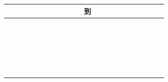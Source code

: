 \documentclass[10pt]{article}
\begin{document}
\begin{center}
\begin{tabular}{|c|c|c|c|c|c|c|c|c|c|c|c|c|c|c|c|c|c|c|c|c|c|}
\hline
 &  &  &  &  &  &  &  &  &  &  & 到 &  &  &  &  &  &  &  &  &  &  \\
\hline
 &  &  &  &  &  &  &  &  &  &  &  &  &  &  &  &  &  &  &  &  &  \\
\hline
 &  &  &  &  &  &  &  &  &  &  &  &  &  &  &  &  &  &  &  &  &  \\
\hline
 &  &  &  &  &  &  &  &  &  &  &  &  &  &  &  &  &  &  &  &  &  \\
\hline
 &  &  &  &  &  &  &  &  &  &  &  &  &  &  &  &  &  &  &  &  &  \\
\hline
 &  &  &  &  &  &  &  &  &  &  &  &  &  &  &  &  &  &  &  &  &  \\
\hline
 &  &  &  &  &  &  &  &  &  &  &  &  &  &  &  &  &  &  &  &  &  \\
\hline
 &  &  &  &  &  &  &  &  &  &  &  &  &  &  &  &  &  &  &  &  &  \\
\hline
 &  &  &  &  &  &  &  &  &  &  &  &  &  &  &  &  &  &  &  &  &  \\
\hline
 &  &  &  &  &  &  &  &  &  &  &  &  &  &  &  &  &  &  &  &  &  \\
\hline
 &  &  &  &  &  &  &  &  &  &  &  &  &  &  &  &  &  &  &  &  &  \\
\hline
 &  &  &  &  &  &  &  &  &  &  &  &  &  &  &  &  &  &  &  &  &  \\
\hline
 &  &  &  &  &  &  &  &  &  &  &  &  &  &  &  &  &  &  &  &  &  \\
\hline
 &  &  &  &  &  &  &  &  &  &  &  &  &  &  &  &  &  &  &  &  &  \\
\hline
 &  &  &  &  &  &  &  &  &  &  &  &  &  &  &  &  &  &  &  &  &  \\
\hline
 &  &  &  &  &  &  &  &  &  &  &  &  &  &  &  &  &  &  &  &  &  \\
\hline
 &  &  &  &  &  &  &  &  &  &  &  &  &  &  &  &  &  &  &  &  &  \\
\hline
 &  &  &  &  &  &  &  &  &  &  &  &  &  &  &  &  &  &  &  &  &  \\
\hline
 &  &  &  &  &  &  &  &  &  &  &  &  &  &  &  &  &  &  &  &  &  \\
\hline
 &  &  &  &  &  &  &  &  &  &  &  &  &  &  &  &  &  &  &  &  &  \\
\hline
 &  &  &  &  &  &  &  &  &  &  &  &  &  &  &  &  &  &  &  &  &  \\
\hline
 &  &  &  &  &  &  &  &  &  &  &  &  &  &  &  &  &  &  &  &  &  \\
\hline
 &  &  &  &  &  &  &  &  &  &  &  &  &  &  &  &  &  &  &  &  &  \\
\hline
 &  &  &  &  &  &  &  &  &  &  &  &  &  &  &  &  &  &  &  &  &  \\
\hline
\end{tabular}
\end{center}
\end{document}
